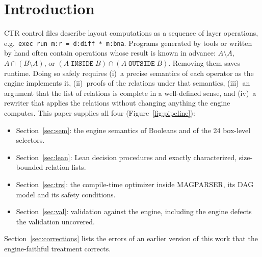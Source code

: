 \documentclass[11pt]{article}
\newcommand{\op}[1]{\texttt{#1}}
\begin{document}
\section{Introduction}
CTR control files describe layout computations as a sequence of layer operations, e.g.\
\texttt{exec run m:r = d:diff * m:bna}. Programs generated by tools or written by hand often contain operations whose result is known in advance: $A\setminus A$, $A\cap(B\setminus A)$, or $(A\;\op{INSIDE}\;B)\cap(A\;\op{OUTSIDE}\;B)$. Removing them saves runtime. Doing so safely requires (i)~a precise semantics of each operator as the engine implements it, (ii)~proofs of the relations under that semantics, (iii)~an argument that the list of relations is complete in a well-defined sense, and (iv)~a rewriter that applies the relations without changing anything the engine computes. This paper supplies all four (Figure~\ref{fig:pipeline}):
\begin{itemize}
\item Section~\ref{sec:sem}: the engine semantics of Booleans and of the 24 box-level selectors.
\item Section~\ref{sec:lean}: Lean decision procedures and exactly characterized, size-bounded relation lists.
\item Section~\ref{sec:trs}: the compile-time optimizer inside MAGPARSER, its DAG model and its safety conditions.
\item Section~\ref{sec:val}: validation against the engine, including the engine defects the validation uncovered.
\end{itemize}
Section~\ref{sec:corrections} lists the errors of an earlier version of this work that the engine-faithful treatment corrects.
\end{document}

